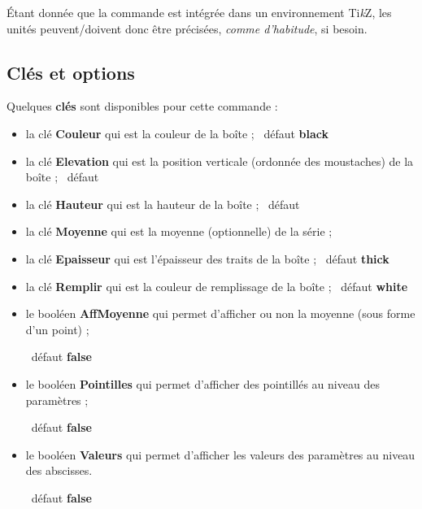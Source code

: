 \documentclass[a4paper,french,11pt]{article}
\providecommand\tikzlogo{Ti\textit{k}Z}
\let\TikZ\tikzlogo
\newcommand\Cle[1]{{\bfseries\sffamily\textlangle #1\textrangle}}
\begin{document}
\begin{PresCodePL}{}
\end{PresCodePL}

\begin{noteblock}
Étant donnée que la commande est intégrée dans un environnement \TikZ, les unités peuvent/doivent donc être précisées, \textit{comme d'habitude}, si besoin.
\end{noteblock}

\subsection{Clés et options}

\begin{cautionblock}
Quelques \Cle{clés} sont disponibles pour cette commande :

\begin{itemize}
	\item la clé \Cle{Couleur} qui est la couleur de la boîte ; \hfill~défaut \Cle{black}
	\item la clé \Cle{Elevation} qui est la position verticale (ordonnée des moustaches) de la boîte ; \hfill~défaut \Cle{1.5}
	\item la clé \Cle{Hauteur} qui est la hauteur de la boîte ; \hfill~défaut \Cle{1}
	\item la clé \Cle{Moyenne} qui est la moyenne (optionnelle) de la série ;
	\item la clé \Cle{Epaisseur} qui est l'épaisseur des traits de la boîte ; \hfill~défaut \Cle{thick}
	\item la clé \Cle{Remplir} qui est la couleur de remplissage de la boîte ; \hfill~défaut \Cle{white}
	\item le booléen \Cle{AffMoyenne} qui permet d'afficher ou non la moyenne (sous forme d'un point) ;
	
	\hfill~défaut \Cle{false}
	\item le booléen \Cle{Pointilles} qui permet d'afficher des pointillés au niveau des paramètres ;
	
	\hfill~défaut \Cle{false}
	\item le booléen \Cle{Valeurs} qui permet d'afficher les valeurs des paramètres au niveau des abscisses.
	
	\hfill~défaut \Cle{false}
\end{itemize}
\vspace*{-\baselineskip}\leavevmode
\end{cautionblock}
\end{document}
